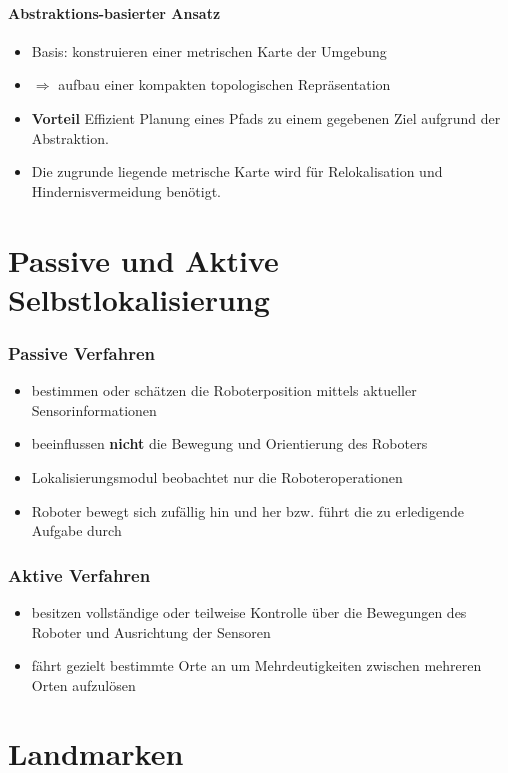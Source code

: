 \paragraph{Abstraktions-basierter Ansatz}
\begin{itemize}
	\item Basis: konstruieren einer metrischen Karte der Umgebung
	\item $\Rightarrow$ aufbau einer kompakten topologischen Repräsentation
	\item \textbf{Vorteil} Effizient Planung eines Pfads zu einem gegebenen Ziel
		aufgrund der Abstraktion.
	\item Die zugrunde liegende metrische Karte wird für Relokalisation und
		Hindernisvermeidung benö\-tigt.
\end{itemize}

\section{Passive und Aktive Selbstlokalisierung}
\subsubsection*{Passive Verfahren}
\begin{itemize}
	\item bestimmen oder schätzen die Roboterposition mittels aktueller
		Sensorinformationen
	\item beeinflussen \textbf{nicht} die Bewegung und Orientierung des Roboters
	\item Lokalisierungsmodul beobachtet nur die Roboteroperationen
	\item Roboter bewegt sich zufällig hin und her bzw. führt die zu erledigende
		Aufgabe durch
\end{itemize}

\subsubsection*{Aktive Verfahren}
\begin{itemize}
	\item besitzen vollständige oder teilweise Kontrolle über die Bewegungen des
		Roboter und Ausrichtung der Sensoren
	\item fährt gezielt bestimmte Orte an um Mehrdeutigkeiten zwischen mehreren
		Orten aufzulösen
\end{itemize}

\section{Landmarken}
